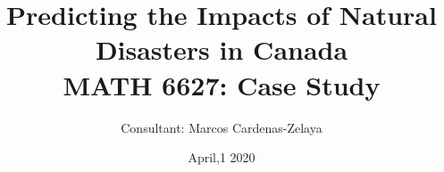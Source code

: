 \documentclass{beamer}
\title[]{Predicting the Impacts of Natural Disasters in Canada\\ 
{
\medskip
}
\small MATH 6627: Case Study}
\author{Consultant: Marcos Cardenas-Zelaya} %

{

\medskip

}
\date{April,1 2020} %
\begin{document}
	
\begin{frame}
	\titlepage 
\end{frame}










\end{document}
